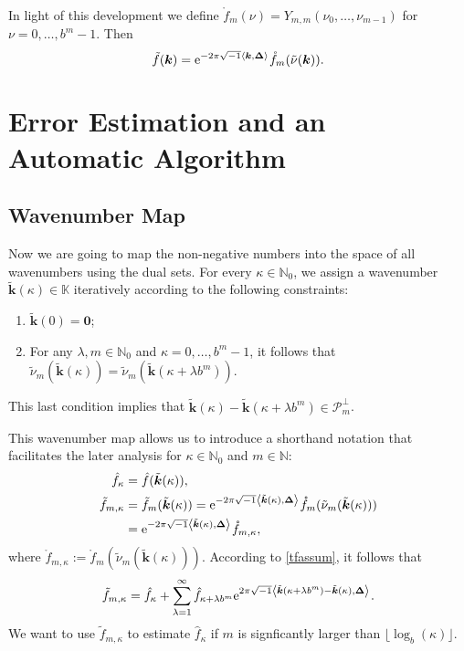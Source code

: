 \documentclass[graybox,footinfo]{svmult}
\newcommand{\naturals}{\mathbb{N}} %
\newcommand{\vzero}{\boldsymbol{0}} %
\newcommand{\vDelta}{\boldsymbol{\Delta}}    %
\newcommand{\natzero}{\mathbb{N}_{0}}
\newcommand{\bbK}{\mathbb{K}}
\newcommand{\ip}[3][{}]{\ensuremath{\left \langle #2, #3 \right \rangle_{#1}}}
\newcommand{\vk}{\boldsymbol{k}}    %
\newcommand{\tvk}{\tilde{\vk}}
\newcommand{\tnu}{\tilde{\nu}}
\newcommand{\cp}{\mathcal{P}}
\newcommand{\hf}{\hat{f}}
\newcommand{\tf}{\tilde{f}}
\newcommand{\rf}{\mathring{f}}
\begin{document}
In light of this development we define $\mathring{f}_m(\nu)=Y_{m,m}(\nu_0, \ldots, \nu_{m-1})$ for $\nu=0, \ldots, b^{m}-1$. Then
\[
\tf(\vk) = \E^{-2 \pi \sqrt{-1} \ip{\vk}{\vDelta}} \mathring{f}_m(\tnu(\vk)).
\]

\section{Error Estimation and an Automatic Algorithm}
\subsection{Wavenumber Map}

Now we are going to map the non-negative numbers into the space of all wavenumbers using the dual sets.  For every $\kappa \in \natzero$, we assign a wavenumber $\tvk(\kappa) \in \bbK$ iteratively according to the following constraints:
\begin{enumerate}
\renewcommand{\labelenumi}{\roman{enumi})}

\item $\tvk(0)= \vzero$;

\item For any $\lambda, m \in \natzero$ and $\kappa=0, \ldots, b^m-1$, it follows that  $\tnu_m(\tvk(\kappa))=\tnu_m(\tvk(\kappa+\lambda b^m))$.

\end{enumerate}
This last condition implies that $\tvk(\kappa) - \tvk(\kappa+\lambda b^m) \in \cp_m^{\perp}$.

This wavenumber map allows us to introduce a shorthand notation that facilitates the later analysis for $\kappa \in \natzero$ and $m \in \naturals$:
\begin{align*}
\hf_{\kappa} & =\hf(\tvk(\kappa)), \\
\tf_{m,\kappa}& = \tf_m(\tvk(\kappa))= \E^{-2 \pi \sqrt{-1} \ip{\tvk(\kappa)}{\vDelta}} \rf_m(\tnu_m(\tvk(\kappa)))\\
&= \E^{-2 \pi \sqrt{-1} \ip{\tvk(\kappa)}{\vDelta}} \rf_{m,\kappa},
\end{align*}
where $\rf_{m,\kappa}:=\rf_m(\tnu_m(\tvk(\kappa)))$. According to \eqref{tfassum}, it follows that
\begin{equation}
\tf_{m,\kappa} = \hf_{\kappa} + \sum_{\lambda=1}^{\infty} \hf_{\kappa+\lambda b^{m}} \E^{2 \pi \sqrt{-1} \ip{\tvk(\kappa+\lambda b^{m}) - \tvk(\kappa)}{\vDelta}}.
\label{tfassumc}
\end{equation}
We want to use $\tf_{m,\kappa}$ to estimate $\hf_{\kappa}$ if $m$ is signficantly larger than $\lfloor \log_b(\kappa) \rfloor$.
\end{document}
